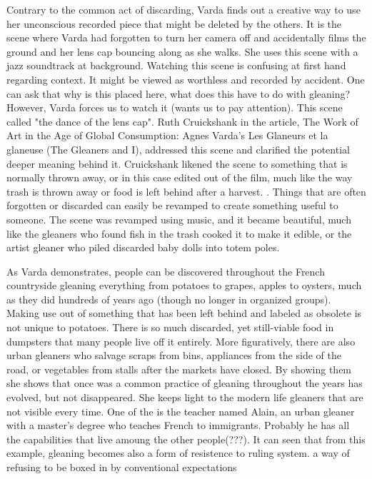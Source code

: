 Contrary to the common act of discarding, Varda finds out a creative way to use her unconscious recorded piece that might be deleted by the others. It is the scene where Varda had forgotten to turn her camera off and accidentally films the ground and her lens cap bouncing along as she walks. She uses this scene with a jazz soundtrack at background. Watching this scene is confusing at first hand regarding context. It might be viewed as worthless and recorded by accident. One can ask that why is this placed here, what does this have to do with gleaning? However, Varda forces us to watch it (wants us to pay attention). This scene called "the dance of the lens cap". Ruth Cruickshank in the article, The Work of Art in the Age of Global Consumption: Agnes Varda’s Les Glaneurs et la glaneuse (The Gleaners and I), addressed this scene and clarified the potential deeper meaning behind it. Cruickshank likened the scene to something that is normally thrown away, or in this case edited out of the film, much like the way trash is thrown away or food is left behind after a harvest.  \cite{cruickshank2007work}. Things that are often forgotten or discarded can easily be revamped to create something useful to someone. The scene was revamped using music, and it became beautiful, much like the gleaners who found fish in the trash cooked it to make it edible, or the artist gleaner who piled discarded baby dolls into totem poles.


As Varda demonstrates, people can be discovered throughout the French countryside gleaning everything from potatoes to grapes, apples to oysters, much as they did hundreds of years ago (though no longer in organized groups). Making use out of something that has been left behind and labeled as obsolete is not unique to potatoes. There is so much discarded, yet still-viable food in dumpsters that many people live off it entirely. More figuratively, there are also urban gleaners who salvage scraps from bins, appliances from the side of the road, or vegetables from stalls after the markets have closed. By showing them she shows that once was a common practice of gleaning throughout the years has evolved, but not disappeared. She keeps light to the modern life gleaners that are not visible every time. One of the is the teacher named Alain, an urban gleaner with a master's degree who teaches French to immigrants. Probably he has all the capabilities that live amoung the other people(???). It can seen that from this example, gleaning becomes also a form of resistence to ruling system. a way of refusing to be boxed in by conventional expectations

